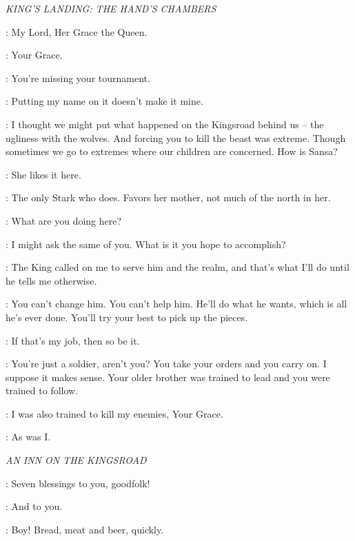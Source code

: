\scene

\textit{KING'S LANDING: THE HAND'S CHAMBERS}


\JORY: My Lord, Her Grace the Queen. 

\NED: Your Grace. 


\CERSEI: You're missing your tournament. 

\NED: Putting my name on it doesn't make it mine. 

\CERSEI: I thought we might put what happened on the Kingsroad behind us -- the ugliness with the wolves. And forcing you to kill the beast was extreme. Though sometimes we go to extremes where our children are concerned. How is Sansa? 

\NED: She likes it here. 

\CERSEI: The only Stark who does. Favors her mother, not much of the north in her. 

\NED: What are you doing here? 

\CERSEI: I might ask the same of you. What is it you hope to accomplish? 

\NED: The King called on me to serve him and the realm, and that's what I'll do until he tells me otherwise. 

\CERSEI: You can't change him. You can't help him. He'll do what he wants, which is all he's ever done. You'll try your best to pick up the pieces. 

\NED: If that's my job, then so be it. 

\CERSEI: You're just a soldier, aren't you? You take your orders and you carry on. I suppose it makes sense. Your older brother was trained to lead and you were trained to follow. 

\NED: I was also trained to kill my enemies, Your Grace. 

\CERSEI: As was I. 

\scene

\textit{AN INN ON THE KINGSROAD}


\MARILLION: Seven blessings to you, goodfolk! 

\CATELYN: And to you. 

\RODRIK: Boy! Bread, meat and beer, quickly. 

